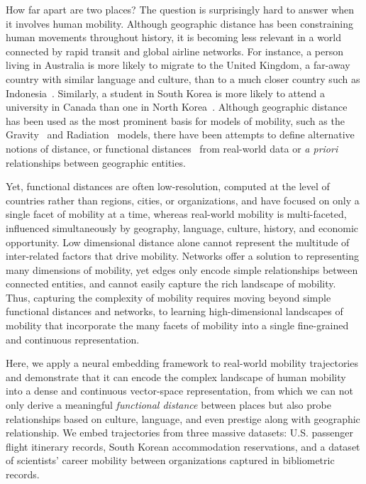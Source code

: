 \documentclass[12pt]{article} %
\begin{document}
How far apart are two places?
The question is surprisingly hard to answer when it involves human mobility.
Although geographic distance has been constraining human movements throughout history, it is becoming less relevant in a world connected by rapid transit and global airline networks.
For instance, a person living in Australia is more likely to migrate to the United Kingdom, a far-away country with similar language and culture, than to a much closer country such as Indonesia~\autocite{pew2018migration}.
Similarly, a student in South Korea is more likely to attend a university in Canada than one in North Korea~\autocite{unesco2019students}.
Although geographic distance has been used as the most prominent basis for models of mobility, such as the Gravity~\autocite{zipf1946gravity} and Radiation~\autocite{simini2012universal} models, there have been attempts to define alternative notions of distance, or functional distances~\autocite{boschma2005proximity, brown1970functional, brown1970migration, kim2018functional} from real-world data or \textit{a priori} relationships between geographic entities.

Yet, functional distances are often low-resolution, computed at the level of countries rather than regions, cities, or organizations, and have focused on only a single facet of mobility at a time, whereas real-world mobility is multi-faceted, influenced simultaneously by geography, language, culture, history, and economic opportunity.  
Low dimensional distance alone cannot represent the multitude of inter-related factors that drive mobility. 
Networks offer a solution to representing many dimensions of mobility, yet edges only encode simple relationships between connected entities, and cannot easily capture the rich landscape of mobility. 
Thus, capturing the complexity of mobility requires moving beyond simple functional distances and networks, to learning high-dimensional landscapes of mobility that incorporate the many facets of mobility into a single fine-grained and continuous representation. 
			
Here, we apply a neural embedding framework to real-world mobility trajectories and demonstrate that it can encode the complex landscape of human mobility into a dense and continuous vector-space representation, from which we can not only derive a meaningful \textit{functional distance} between places but also probe relationships based on culture, language, and even prestige along with geographic relationship. 
We embed trajectories from three massive datasets: U.S. passenger flight itinerary records, South Korean accommodation reservations, and a dataset of scientists' career mobility between organizations captured in bibliometric records. 
\end{document}
